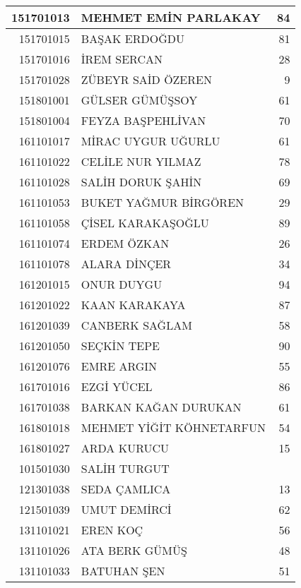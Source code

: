 \documentclass[12pt]{article}
\begin{document}
\begin{longtable}{||r||l||r||}
    \midrule
    151701013 & MEHMET EMİN PARLAKAY & 84 \\
    \midrule
    151701015 & BAŞAK ERDOĞDU & 81 \\
    \midrule
    151701016 & İREM SERCAN & 28 \\
    \midrule
    151701028 & ZÜBEYR SAİD ÖZEREN & 9 \\
    \midrule
    151801001 & GÜLSER GÜMÜŞSOY & 61 \\
    \midrule
    151801004 & FEYZA BAŞPEHLİVAN & 70 \\
    \midrule
    161101017 & MİRAC UYGUR UĞURLU & 61 \\
    \midrule
    161101022 & CELİLE NUR YILMAZ & 78 \\
    \midrule
    161101028 & SALİH DORUK ŞAHİN & 69 \\
    \midrule
    161101053 & BUKET YAĞMUR BİRGÖREN & \cellcolor[rgb]{ 1,  1,  0} 29 \\
    \midrule
    161101058 & ÇİSEL KARAKAŞOĞLU & 89 \\
    \midrule
    161101074 & ERDEM ÖZKAN & 26 \\
    \midrule
    161101078 & ALARA DİNÇER & \cellcolor[rgb]{ 1,  1,  0} 34 \\
    \midrule
    161201015 & ONUR DUYGU & 94 \\
    \midrule
    161201022 & KAAN KARAKAYA & 87 \\
    \midrule
    161201039 & CANBERK SAĞLAM & 58 \\
    \midrule
    161201050 & SEÇKİN TEPE & 90 \\
    \midrule
    161201076 & EMRE ARGIN & \cellcolor[rgb]{ 1,  1,  0} 55 \\
    \midrule
    161701016 & EZGİ YÜCEL & 86 \\
    \midrule
    161701038 & BARKAN KAĞAN DURUKAN & 61 \\
    \midrule
    161801018 & MEHMET YİĞİT KÖHNETARFUN & 54 \\
    \midrule
    161801027 & ARDA KURUCU & 15 \\
    \midrule
    101501030 & SALİH TURGUT &  \\
    \midrule
    121301038 & SEDA ÇAMLICA & 13 \\
    \midrule
    121501039 & UMUT DEMİRCİ & 62 \\
    \midrule
    131101021 & EREN KOÇ & 56 \\
    \midrule
    131101026 & ATA BERK GÜMÜŞ & 48 \\
    \midrule
    131101033 & BATUHAN ŞEN & 51 \\

\end{longtable}
\end{document}
